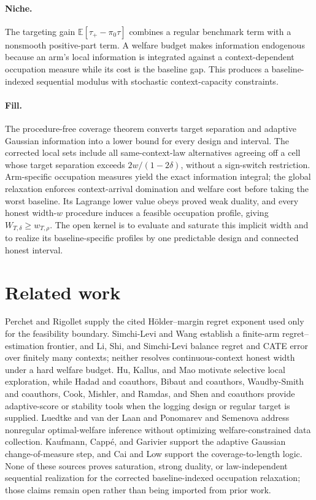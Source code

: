 \documentclass{article}
\begin{document}
\paragraph{Niche.} The targeting gain \(\mathbb E[\tau_+-\pi_0\tau]\) combines a regular benchmark term with a nonsmooth positive-part term. A welfare budget makes information endogenous because an arm's local information is integrated against a context-dependent occupation measure while its cost is the baseline gap. This produces a baseline-indexed sequential modulus with stochastic context-capacity constraints.

\paragraph{Fill.} The procedure-free coverage theorem converts target separation and adaptive Gaussian information into a lower bound for every design and interval. The corrected local sets include all same-context-law alternatives agreeing off a cell whose target separation exceeds \(2w/(1-2\delta)\), without a sign-switch restriction. Arm-specific occupation measures yield the exact information integral; the global relaxation enforces context-arrival domination and welfare cost before taking the worst baseline. Its Lagrange lower value obeys proved weak duality, and every honest width-\(w\) procedure induces a feasible occupation profile, giving \(W_{T,\delta}\ge w_{T,\rho}\). The open kernel is to evaluate and saturate this implicit width and to realize its baseline-specific profiles by one predictable design and connected honest interval.

\section{Related work}

Perchet and Rigollet supply the cited H\"older--margin regret exponent used only for the feasibility boundary. Simchi-Levi and Wang establish a finite-arm regret--estimation frontier, and Li, Shi, and Simchi-Levi balance regret and CATE error over finitely many contexts; neither resolves continuous-context honest width under a hard welfare budget. Hu, Kallus, and Mao motivate selective local exploration, while Hadad and coauthors, Bibaut and coauthors, Waudby-Smith and coauthors, Cook, Mishler, and Ramdas, and Shen and coauthors provide adaptive-score or stability tools when the logging design or regular target is supplied. Luedtke and van der Laan and Ponomarev and Semenova address nonregular optimal-welfare inference without optimizing welfare-constrained data collection. Kaufmann, Capp\'e, and Garivier support the adaptive Gaussian change-of-measure step, and Cai and Low support the coverage-to-length logic. None of these sources proves saturation, strong duality, or law-independent sequential realization for the corrected baseline-indexed occupation relaxation; those claims remain open rather than being imported from prior work.
\end{document}
